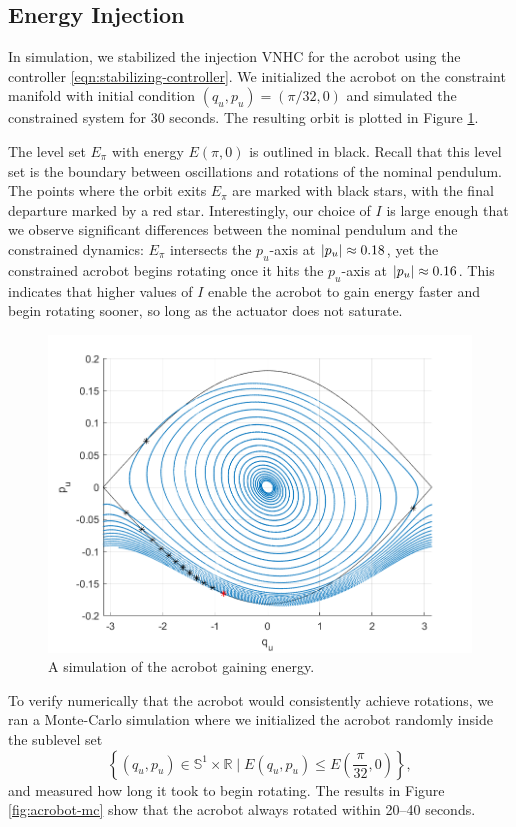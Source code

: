 \documentclass[journal,twoside,web, onecolumn, draftcls]{ieeecolor}
\DeclarePairedDelimiter{\abs}{\lvert}{\rvert}
\newcommand*{\R}{\mathbb{R}}
\newcommand*{\Sone}{\mathbb{S}^1}
\newcommand*{\SxR}{\Sone \times \R}
\begin{document}
\subsection{Energy Injection}

In simulation, we stabilized the injection VNHC for the acrobot using the
controller \eqref{eqn:stabilizing-controller}.
We initialized the acrobot on the constraint manifold
with initial condition \((q_u,p_u) = \left(\pi/32,0 \right)\) and simulated the
constrained system for \(30\) seconds.
The resulting orbit is plotted in Figure
\ref{fig:acrobot-in-orbit}.

The level set \(E_\pi\) with energy \(E(\pi,0)\) is outlined in black.
Recall that this level set is the boundary between oscillations and rotations of the
nominal pendulum.
The points where the orbit exits \(E_\pi\) are marked with black stars,
with the final departure marked by a red star.
Interestingly, our choice of \(I\) is large enough that we observe significant
differences between the nominal pendulum and the constrained dynamics:
\(E_\pi\) intersects the \(p_u\)-axis at \(\abs{p_u} \approx 0.18\), yet the
constrained acrobot begins rotating once it hits the
\(p_u\)-axis at \(\abs{p_u} \approx 0.16\). 
This indicates that higher values of \(I\) enable the acrobot to gain energy
faster and begin rotating sooner, so long as the actuator does not saturate.

\begin{figure}[]
    \centering
    \includegraphics[width=0.8\linewidth]{acrobot_in_orbit.png}
    \caption{A simulation of the acrobot gaining energy.}
    \label{fig:acrobot-in-orbit}
\end{figure}

To verify numerically that the acrobot would consistently achieve rotations, we
ran a Monte-Carlo \cite{montecarlo} simulation where we initialized the acrobot
randomly inside the sublevel set
\[
    \left\{(q_u,p_u) \in \SxR \mid
    E(q_u,p_u) \leq E\left(\frac{\pi}{32},0\right)\right\}
    ,
\] 
and measured how long it took to begin rotating.
The results in Figure \ref{fig:acrobot-mc} show that
the acrobot always rotated within 20--40 seconds.
\end{document}
